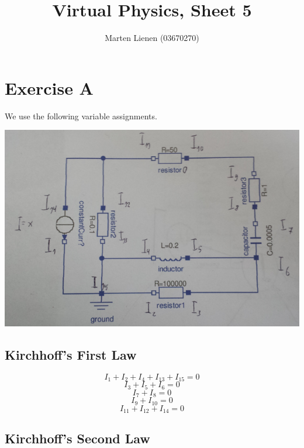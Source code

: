 \documentclass[10pt,a4paper]{article}
\title{Virtual Physics, Sheet 5}
\author{Marten Lienen (03670270)}
\begin{document}
\maketitle

\section*{Exercise A}

We use the following variable assignments.

\includegraphics[width=\textwidth]{sheet-5/A}

\subsection*{Kirchhoff's First Law}

\begin{equation*}
  I_{1} + I_{2} + I_{4} + I_{13} + I_{15} = 0
\end{equation*}
\begin{equation*}
  I_{3} + I_{5} + I_{6} = 0
\end{equation*}
\begin{equation*}
  I_{7} + I_{8} = 0
\end{equation*}
\begin{equation*}
  I_{9} + I_{10} = 0
\end{equation*}
\begin{equation*}
  I_{11} + I_{12} + I_{14} = 0
\end{equation*}

\subsection*{Kirchhoff's Second Law}
\end{document}
